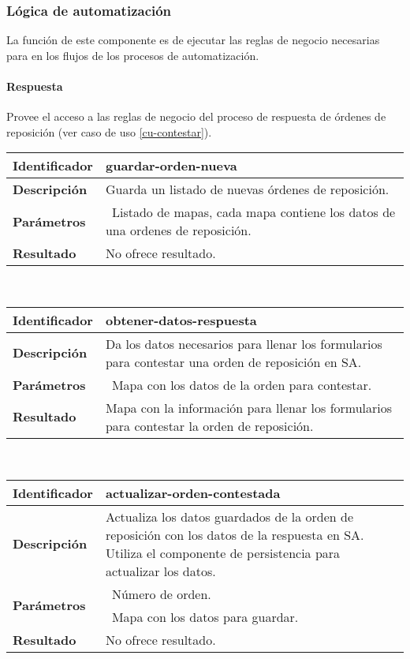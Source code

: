 \subsubsection{Lógica de automatización}
La función de este componente es de ejecutar las reglas de negocio necesarias para en los flujos de los procesos de automatización.  
\paragraph{Respuesta\\}
Provee el acceso a las reglas de negocio del proceso de respuesta de órdenes de reposición (ver caso de uso \ref{cu-contestar}).
	\vspace{5mm}\\
	\begin{tabular}{|p{}|p{}|}
		\hline
		\textbf{Identificador}	& \textbf{guardar-orden-nueva}\\
		\hline
		\hline
		\textbf{Descripción}	& Guarda un listado de nuevas órdenes de reposición.\\
		\hline
		\textbf{Parámetros}		& \textbullet\, Listado de mapas, cada mapa contiene los datos de una ordenes de reposición.\\
		\hline
		\textbf{Resultado}		& No ofrece resultado.\\
		\hline
	\end{tabular}
	\vspace{5mm}\\
	\begin{tabular}{|p{}|p{}|}
		\hline
		\textbf{Identificador}	& \textbf{obtener-datos-respuesta}\\
		\hline
		\hline
		\textbf{Descripción}	& Da los datos necesarios para llenar los formularios para contestar una orden de reposición en SA.\\
		\hline
		\textbf{Parámetros}		& \textbullet\, Mapa con los datos de la orden para contestar.\\
		\hline
		\textbf{Resultado}		& Mapa con la información para llenar los formularios para contestar la orden de reposición.\\
		\hline
	\end{tabular}
	\vspace{5mm}\\
	\begin{tabular}{|p{}|p{}|}
		\hline
		\textbf{Identificador}	& \textbf{actualizar-orden-contestada}\\
		\hline
		\hline
		\textbf{Descripción}	& Actualiza los datos guardados de la orden de reposición con los datos de la respuesta en SA. Utiliza el componente de persistencia para actualizar los datos.\\
		\hline
		\multirow{2}{*}{\textbf{Parámetros}}	& \textbullet\, Número de orden.\\
												& \textbullet\, Mapa con los datos para guardar.\\
		\hline
		\textbf{Resultado}		& No ofrece resultado.\\
		\hline
	\end{tabular}
